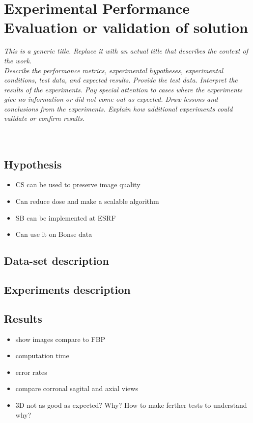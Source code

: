 \chapter{Experimental Performance Evaluation or validation of solution}
\textit{This is a generic title. Replace it with an actual title that describes the context of the work.\\
Describe the  performance metrics, experimental hypotheses,  experimental conditions, test data, and expected results.  Provide the test data.  Interpret the results of the experiments.  Pay special attention to cases where the experiments give no information or did not come out as expected.  Draw lessons and conclusions from the experiments. Explain how additional experiments could validate or confirm results.}\\
\\
\\
\section{Hypothesis}
\begin{itemize}
	\item CS can be used to preserve image quality
	\item Can reduce dose and make a scalable algorithm
	\item SB can be implemented at ESRF
	\item Can use it on Bonse data
\end{itemize}

\section{Data-set description}

\section{Experiments description}

\section{Results}

\begin{itemize}
	\item show images compare to FBP
	\item computation time
	\item error rates
	\item compare corronal sagital and axial views
	\item 3D not as good as expected? Why? How to make ferther tests to understand why?
\end{itemize}